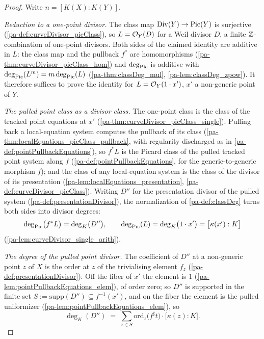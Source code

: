 \begin{proof}
  \leanok
  Write \(n = [K(X) : K(Y)]\).

  \emph{Reduction to a one-point divisor.} The class map
  \(\operatorname{Div}(Y) \to \operatorname{Pic}(Y)\) is surjective (\ref{pa-def:curveDivisor_picClass}), so
  \(L = \mathcal{O}_{Y}(D)\) for a Weil divisor \(D\), a finite \(\mathbb{Z}\)-combination of
  one-point divisors. Both sides of the claimed identity are additive in \(L\): the
  class map and the pullback \(f^{*}\) are homomorphisms
  (\ref{pa-thm:curveDivisor_picClass_hom}) and \(\deg_{\operatorname{Pic}}\) is additive with
  \(\deg_{\operatorname{Pic}}(L^m) = m \deg_{\operatorname{Pic}}(L)\) (\ref{pa-thm:classDeg_mul},
  \ref{pa-lem:classDeg_zpow}). It therefore suffices to prove the identity for
  \(L = \mathcal{O}_{Y}(1 \cdot x')\), \(x'\) a non-generic point of \(Y\).

  \emph{The pulled point class as a divisor class.} The one-point class is the class
  of the tracked point equations at \(x'\) (\ref{pa-thm:curveDivisor_picClass_single}).
  Pulling back a local-equation system computes the pullback of its class
  (\ref{pa-thm:localEquations_picClass_pullback}, with regularity discharged as in
  \ref{pa-def:pointPullbackEquations}), so \(f^{*}L\) is the Picard class of the pulled
  tracked point system along \(f\) (\ref{pa-def:pointPullbackEquations}, for the
  generic-to-generic morphism \(f\)); and the class of any local-equation system is
  the class of the divisor of its presentation
  (\ref{pa-lem:localEquations_presentation}, \ref{pa-def:curveDivisor_picClass}). Writing
  \(D''\) for the presentation divisor of the pulled system
  (\ref{pa-def:presentationDivisor}), the normalization of \ref{pa-def:classDeg} turns both
  sides into divisor degrees:
  \[
    \deg_{\operatorname{Pic}}\bigl(f^{*}L\bigr) = \deg_{K}\bigl(D''\bigr), \qquad
    \deg_{\operatorname{Pic}}(L) = \deg_{K}\bigl(1 \cdot x'\bigr) = \bigl[\kappa(x') : K\bigr]
  \]
  (\ref{pa-lem:curveDivisor_single_arith}).

  \emph{The degree of the pulled point divisor.} The coefficient of \(D''\) at a
  non-generic point \(z\) of \(X\) is the order at \(z\) of the trivialising element
  \(f_z\) (\ref{pa-def:presentationDivisor}). Off the fiber of \(x'\) the element is
  \(1\) (\ref{pa-lem:pointPullbackEquations_elem}), of order zero; so \(D''\) is
  supported in the finite set \(S := \mathrm{supp}(D'') \subseteq f^{-1}(x')\), and on
  the fiber the element is the pulled uniformizer
  (\ref{pa-lem:pointPullbackEquations_elem}), so
  \[
    \deg_{K}(D'') \;=\; \sum_{z \in S}
      \mathrm{ord}_z\bigl(f^{\sharp}t\bigr) \cdot \bigl[\kappa(z) : K\bigr].
  \]


\end{proof}
